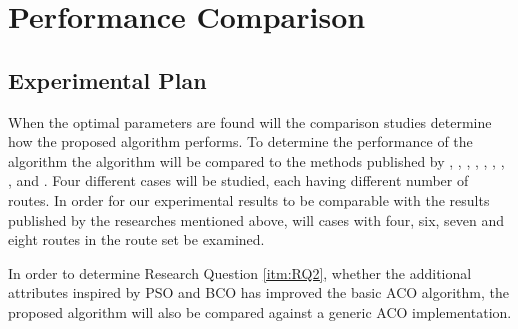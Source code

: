 \section{Performance Comparison}
\label{sec:performanceComparison}
\subsection{Experimental Plan}
When the optimal parameters are found will the comparison studies determine how the proposed algorithm performs. To determine the performance of the algorithm the algorithm will be compared to the methods published by \citet{mandl79}, \citet{kechagiopoulos14}, \citet{nikolic14}, \citet{kidwai98}, \citet{fan10}, \citet{chakroborty02}, \citet{zhang10}, \citet{chew12}, and \citet{baaj91}. Four different cases will be studied, each having different number of routes. In order for our experimental results to be comparable with the results published by the researches mentioned above, will cases with four, six, seven and eight routes in the route set be examined.

In order to determine Research Question \vref{itm:RQ2}, whether the additional attributes inspired by PSO and BCO has improved the basic ACO algorithm, the proposed algorithm will also be compared against a generic ACO implementation.

